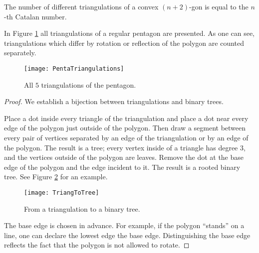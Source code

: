 \begin{page}
\setcounter{section}{4}
\setcounter{subsection}{4}
\setcounter{dfn}{6}
\label{portion:876}

\begin{thm}
The number of different triangulations of a convex $(n+2)$-gon is equal to the $n$-th Catalan number.
\end{thm}

\end{page}

\begin{page}
\setcounter{section}{4}
\setcounter{subsection}{5}
\setcounter{dfn}{6}
\label{portion:877}

In Figure \ref{fig:PentaTriangulations} all triangulations of a regular pentagon are presented.
As one can see, triangulations which differ by rotation or reflection of the polygon are counted separately.

\begin{figure}[ht]
\begin{center}
\texttt{[image: PentaTriangulations]}
\end{center}
\caption{All $5$ triangulations of the pentagon.}
\label{fig:PentaTriangulations}
\end{figure}


\begin{proof}
We establish a bijection between triangulations and binary trees.

Place a dot inside every triangle of the triangulation and place a dot near every edge of the polygon just outside of the polygon.
Then draw a segment between every pair of vertices separated by an edge of the triangulation or by an edge of the polygon.
The result is a tree; every vertex inside of a triangle has degree $3$, and the vertices outside of the polygon are leaves.
Remove the dot at the base edge of the polygon and the edge incident to it.
The result is a rooted binary tree.
See Figure \ref{fig:TriangToTree} for an example.

\begin{figure}[ht]
\begin{center}
\texttt{[image: TriangToTree]}
\end{center}
\caption{From a triangulation to a binary tree.}
\label{fig:TriangToTree}
\end{figure}

The base edge is chosen in advance.
For example, if the polygon ``stands'' on a line, one can declare the lowest edge the base edge.
Distinguishing the base edge reflects the fact that the polygon is not allowed to rotate.


\end{proof}
\end{page}
